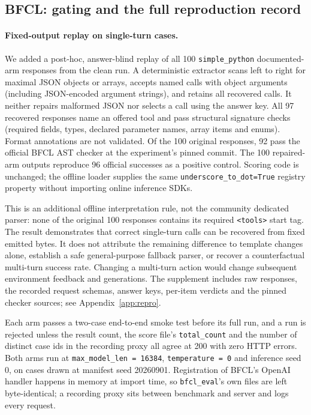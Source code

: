 \subsection{BFCL: gating and the full reproduction record}
\label{app:bfcl}

\paragraph{Fixed-output replay on single-turn cases.}
\label{app:fixedreplay}
We added a post-hoc, answer-blind replay of all 100 \texttt{simple\_python} documented-arm
responses from the clean run. A deterministic extractor scans left to right for maximal JSON
objects or arrays, accepts named calls with object arguments (including JSON-encoded argument
strings), and retains all recovered calls. It neither repairs malformed JSON nor selects a
call using the answer key. All 97 recovered responses name an offered tool and pass structural
signature checks (required fields, types, declared parameter names, array items and enums).
Format annotations are not validated. Of the 100 original responses, 92 pass the official
BFCL AST checker at the experiment's pinned commit. The 100 repaired-arm outputs reproduce
96 official successes as a positive control. Scoring code is unchanged; the offline loader
supplies the same \texttt{underscore\_to\_dot=True} registry property without importing
online inference SDKs.

This is an additional offline interpretation rule, not the community dedicated parser:
none of the original 100 responses contains its required \texttt{<tools>} start tag.
The result demonstrates that correct single-turn calls can be recovered from fixed emitted
bytes. It does not attribute the remaining difference to template changes alone, establish
a safe general-purpose fallback parser, or recover a counterfactual multi-turn success rate.
Changing a multi-turn action would change subsequent environment feedback and generations.
The supplement includes raw responses, the recorded request schemas, answer keys, per-item
verdicts and the pinned checker sources; see Appendix~\ref{app:repro}.

Each arm passes a two-case end-to-end smoke test before its full run, and a run is rejected
unless the result count, the score file's \texttt{total\_count} and the number of distinct case
ids in the recording proxy all agree at 200 with zero HTTP errors. Both arms run at \texttt{max\_model\_len = 16384}, \texttt{temperature = 0} and inference seed
0, on cases drawn at manifest seed 20260901. Registration of BFCL's OpenAI
handler happens in memory at import time, so \texttt{bfcl\_eval}'s own files are left
byte-identical; a recording proxy sits between benchmark and server and logs every request.


